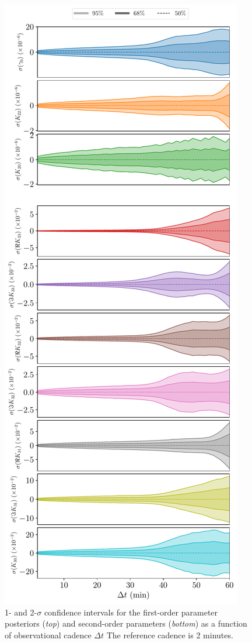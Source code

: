 \documentclass[fleqn,usenatbib]{mnras}
\begin{document}
\begin{figure}
  \centering
  \includegraphics[height=0.89\textheight]{figs/scan-cadence.pdf}
  \caption{1- and 2-$\sigma$ confidence intervals for the first-order parameter posteriors (\textit{top}) and second-order parameters (\textit{bottom}) as a function of observational cadence $\Delta t$ The reference cadence is 2 minutes.}
  \label{fig:scan-cadence}
\end{figure}
\end{document}
